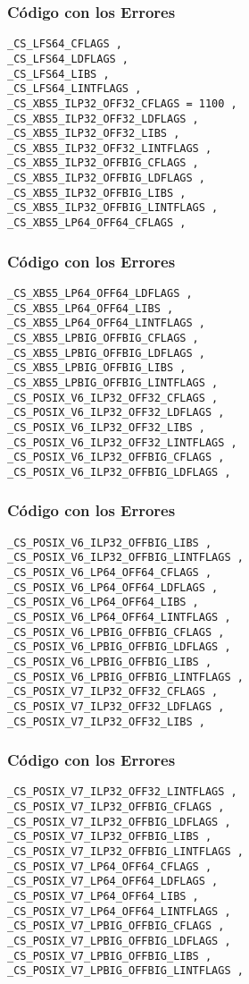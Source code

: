 \documentclass{beamer}
\begin{document}
\begin{frame}[fragile]
\frametitle{C\'odigo con los Errores}
\begin{lstlisting}[style=CStyle]
_CS_LFS64_CFLAGS , 
_CS_LFS64_LDFLAGS , 
_CS_LFS64_LIBS , 
_CS_LFS64_LINTFLAGS , 
_CS_XBS5_ILP32_OFF32_CFLAGS = 1100 , 
_CS_XBS5_ILP32_OFF32_LDFLAGS , 
_CS_XBS5_ILP32_OFF32_LIBS , 
_CS_XBS5_ILP32_OFF32_LINTFLAGS , 
_CS_XBS5_ILP32_OFFBIG_CFLAGS , 
_CS_XBS5_ILP32_OFFBIG_LDFLAGS , 
_CS_XBS5_ILP32_OFFBIG_LIBS , 
_CS_XBS5_ILP32_OFFBIG_LINTFLAGS , 
_CS_XBS5_LP64_OFF64_CFLAGS , 
\end{lstlisting}
\end{frame}
\begin{frame}[fragile]
\frametitle{C\'odigo con los Errores}
\begin{lstlisting}[style=CStyle]
_CS_XBS5_LP64_OFF64_LDFLAGS , 
_CS_XBS5_LP64_OFF64_LIBS , 
_CS_XBS5_LP64_OFF64_LINTFLAGS , 
_CS_XBS5_LPBIG_OFFBIG_CFLAGS , 
_CS_XBS5_LPBIG_OFFBIG_LDFLAGS , 
_CS_XBS5_LPBIG_OFFBIG_LIBS , 
_CS_XBS5_LPBIG_OFFBIG_LINTFLAGS , 
_CS_POSIX_V6_ILP32_OFF32_CFLAGS , 
_CS_POSIX_V6_ILP32_OFF32_LDFLAGS , 
_CS_POSIX_V6_ILP32_OFF32_LIBS , 
_CS_POSIX_V6_ILP32_OFF32_LINTFLAGS , 
_CS_POSIX_V6_ILP32_OFFBIG_CFLAGS , 
_CS_POSIX_V6_ILP32_OFFBIG_LDFLAGS , 
\end{lstlisting}
\end{frame}
\begin{frame}[fragile]
\frametitle{C\'odigo con los Errores}
\begin{lstlisting}[style=CStyle]
_CS_POSIX_V6_ILP32_OFFBIG_LIBS , 
_CS_POSIX_V6_ILP32_OFFBIG_LINTFLAGS , 
_CS_POSIX_V6_LP64_OFF64_CFLAGS , 
_CS_POSIX_V6_LP64_OFF64_LDFLAGS , 
_CS_POSIX_V6_LP64_OFF64_LIBS , 
_CS_POSIX_V6_LP64_OFF64_LINTFLAGS , 
_CS_POSIX_V6_LPBIG_OFFBIG_CFLAGS , 
_CS_POSIX_V6_LPBIG_OFFBIG_LDFLAGS , 
_CS_POSIX_V6_LPBIG_OFFBIG_LIBS , 
_CS_POSIX_V6_LPBIG_OFFBIG_LINTFLAGS , 
_CS_POSIX_V7_ILP32_OFF32_CFLAGS , 
_CS_POSIX_V7_ILP32_OFF32_LDFLAGS , 
_CS_POSIX_V7_ILP32_OFF32_LIBS , 
\end{lstlisting}
\end{frame}
\begin{frame}[fragile]
\frametitle{C\'odigo con los Errores}
\begin{lstlisting}[style=CStyle]
_CS_POSIX_V7_ILP32_OFF32_LINTFLAGS , 
_CS_POSIX_V7_ILP32_OFFBIG_CFLAGS , 
_CS_POSIX_V7_ILP32_OFFBIG_LDFLAGS , 
_CS_POSIX_V7_ILP32_OFFBIG_LIBS , 
_CS_POSIX_V7_ILP32_OFFBIG_LINTFLAGS , 
_CS_POSIX_V7_LP64_OFF64_CFLAGS , 
_CS_POSIX_V7_LP64_OFF64_LDFLAGS , 
_CS_POSIX_V7_LP64_OFF64_LIBS , 
_CS_POSIX_V7_LP64_OFF64_LINTFLAGS , 
_CS_POSIX_V7_LPBIG_OFFBIG_CFLAGS , 
_CS_POSIX_V7_LPBIG_OFFBIG_LDFLAGS , 
_CS_POSIX_V7_LPBIG_OFFBIG_LIBS , 
_CS_POSIX_V7_LPBIG_OFFBIG_LINTFLAGS , 
\end{lstlisting}
\end{frame}
\end{document}
